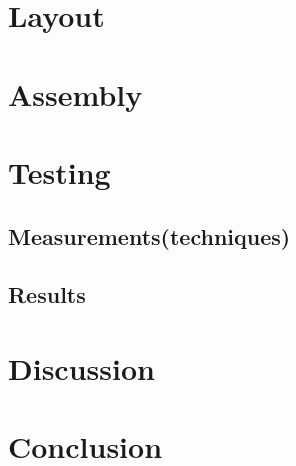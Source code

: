 \documentclass[12pt,English,a4paper,twoside,openright]{article}
\begin{document}
\section{Layout}
\section{Assembly}
\section{Testing}
\subsection{Measurements(techniques)}
\subsection{Results}
\section{Discussion}
\section{Conclusion}

\newpage


\end{document}
